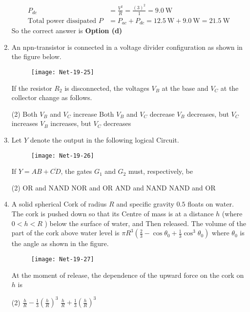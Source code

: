 \begin{enumerate}
\begin{answer}
\begin{align*}
	P_{d c}&=\frac{V^{2}}{R}=\frac{(3)^{2}}{1}=9.0 \mathrm{~W}\\
	\text{Total power dissipated }P&=P_{a c}+P_{d c}=12.5 \mathrm{~W}+9.0 \mathrm{~W}=21.5 \mathrm{~W}
	\end{align*}
		So the correct answer is \textbf{Option (d)}
\end{answer}
\item  An npn-transistor is connected in a voltage divider configuration as shown in the figure below.
\begin{figure}[H]
	\centering
	\texttt{[image: Net-19-25]}
\end{figure}
If the resistor $R_{2}$ is disconnected, the voltages $V_{B}$ at the base and $V_{C}$ at the collector change as follows.
 \begin{tasks}(2)
	\task[\textbf{a.}]Both $V_{B}$ and $V_{C}$ increase
	\task[\textbf{b.}]Both $V_{B}$ and $V_{C}$ decrease
	\task[\textbf{c.}]$V_{B}$ decreases, but $V_{C}$ increases
	\task[\textbf{d.}]$V_{B}$ increases, but $V_{C}$ decreases
\end{tasks}
\item  Let $Y$ denote the output in the following logical Circuit.
\begin{figure}[H]
	\centering
	\texttt{[image: Net-19-26]}
\end{figure}
If $Y=A B+\overline{C D}$, the gates $G_{1}$ and $G_{2}$ must, respectively, be
 \begin{tasks}(2)
	\task[\textbf{a.}]OR and NAND
	\task[\textbf{b.}]NOR and $\mathrm{OR}$
	\task[\textbf{c.}] AND and NAND
	\task[\textbf{d.}]  NAND and OR
\end{tasks}
\item  A solid spherical Cork of radius $R$ and specific gravity $0.5$ floats on water. The cork is pushed down so that its Centre of mass is at a distance $h$ (where $0<h<R$ ) below the surface of water, and Then released. The volume of the part of the cork above water level is $\pi R^{3}\left(\frac{2}{3}-\cos \theta_{0}+\frac{1}{3} \cos ^{3} \theta_{0}\right)$ where $\theta_{0}$ is the angle as shown in the figure.
\begin{figure}[H]
	\centering
	\texttt{[image: Net-19-27]}
\end{figure}
At the moment of release, the dependence of the upward force on the cork on $h$ is
 \begin{tasks}(2)
	\task[\textbf{a.}]$\frac{h}{R}-\frac{1}{3}\left(\frac{h}{R}\right)^{3}$
	\task[\textbf{b.}]$\frac{h}{R}+\frac{1}{3}\left(\frac{h}{R}\right)^{3}$

\end{tasks}
\end{enumerate}
